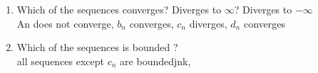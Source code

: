 \documentclass[11pt]{article}
\theoremstyle{definition}  %
\begin{document}
\begin{enumerate}
\begin{enumerate}
    \item Which of the sequences converges? Diverges to $\infty$? Diverges to $-\infty$\\
    An does not converge, $b_n$ converges, $c_n$ diverges, $d_n$ converges
    \item Which of the sequences is bounded ?\\
    all sequences except $c_n$ are boundedjnk,
  \end{enumerate}
\end{enumerate}
\end{document}
